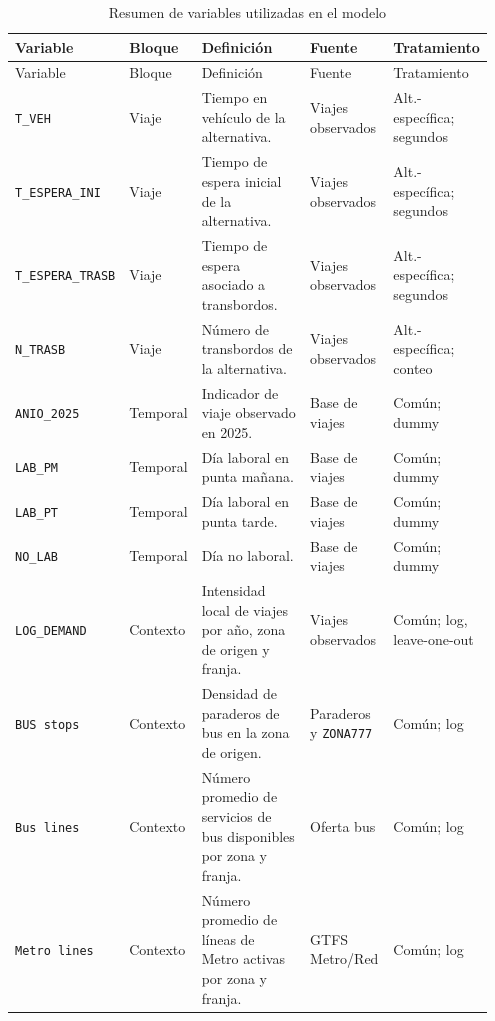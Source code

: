 \begin{landscape}
\begingroup
\scriptsize
\setlength{\tabcolsep}{3pt}
\begin{longtable}{p{0.16\linewidth} p{0.10\linewidth} p{0.35\linewidth} p{0.18\linewidth} p{0.16\linewidth}}
\caption{Resumen de variables utilizadas en el modelo}
\label{tab:variables_resumen}\\
\toprule
Variable & Bloque & Definición & Fuente & Tratamiento \\
\midrule
\endfirsthead

\toprule
Variable & Bloque & Definición & Fuente & Tratamiento \\
\midrule
\endhead

\bottomrule
\endfoot

\texttt{T\_VEH} & Viaje & Tiempo en vehículo de la alternativa. & Viajes observados & Alt.-específica; segundos \\
\texttt{T\_ESPERA\_INI} & Viaje & Tiempo de espera inicial de la alternativa. & Viajes observados & Alt.-específica; segundos \\
\texttt{T\_ESPERA\_TRASB} & Viaje & Tiempo de espera asociado a transbordos. & Viajes observados & Alt.-específica; segundos \\
\texttt{N\_TRASB} & Viaje & Número de transbordos de la alternativa. & Viajes observados & Alt.-específica; conteo \\

\texttt{ANIO\_2025} & Temporal & Indicador de viaje observado en 2025. & Base de viajes & Común; dummy \\
\texttt{LAB\_PM} & Temporal & Día laboral en punta mañana. & Base de viajes & Común; dummy \\
\texttt{LAB\_PT} & Temporal & Día laboral en punta tarde. & Base de viajes & Común; dummy \\
\texttt{NO\_LAB} & Temporal & Día no laboral. & Base de viajes & Común; dummy \\

\texttt{LOG\_DEMAND} & Contexto & Intensidad local de viajes por año, zona de origen y franja. & Viajes observados & Común; log, leave-one-out \\
\texttt{BUS stops} & Contexto & Densidad de paraderos de bus en la zona de origen. & Paraderos y \texttt{ZONA777} & Común; log \\
\texttt{Bus lines} & Contexto & Número promedio de servicios de bus disponibles por zona y franja. & Oferta bus & Común; log \\
\texttt{Metro lines} & Contexto & Número promedio de líneas de Metro activas por zona y franja. & GTFS Metro/Red & Común; log \\


\end{longtable}
\end{landscape}
